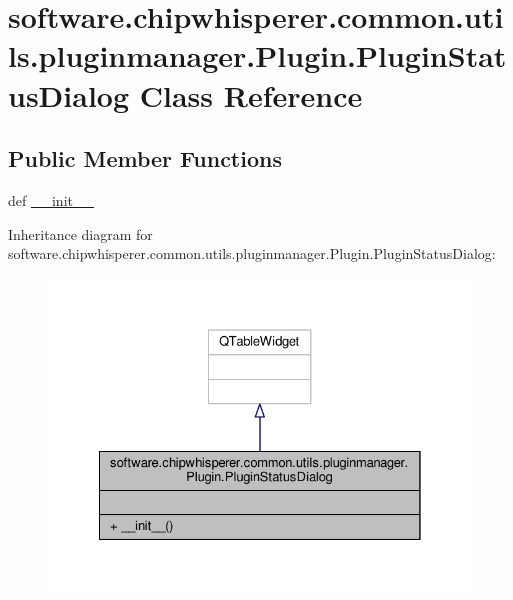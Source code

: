 \hypertarget{classsoftware_1_1chipwhisperer_1_1common_1_1utils_1_1pluginmanager_1_1Plugin_1_1PluginStatusDialog}{}\section{software.\+chipwhisperer.\+common.\+utils.\+pluginmanager.\+Plugin.\+Plugin\+Status\+Dialog Class Reference}
\label{classsoftware_1_1chipwhisperer_1_1common_1_1utils_1_1pluginmanager_1_1Plugin_1_1PluginStatusDialog}
\subsection*{Public Member Functions}
\begin{DoxyCompactItemize}
\item 
def \hyperlink{classsoftware_1_1chipwhisperer_1_1common_1_1utils_1_1pluginmanager_1_1Plugin_1_1PluginStatusDialog_a8bc46975d63d33b425f484c503e6e6f8}{\+\_\+\+\_\+init\+\_\+\+\_\+}
\end{DoxyCompactItemize}


Inheritance diagram for software.\+chipwhisperer.\+common.\+utils.\+pluginmanager.\+Plugin.\+Plugin\+Status\+Dialog\+:\nopagebreak
\begin{figure}[H]
\begin{center}
\leavevmode
\includegraphics[width=328pt]{dc/ddd/classsoftware_1_1chipwhisperer_1_1common_1_1utils_1_1pluginmanager_1_1Plugin_1_1PluginStatusDialog__inherit__graph}
\end{center}
\end{figure}


